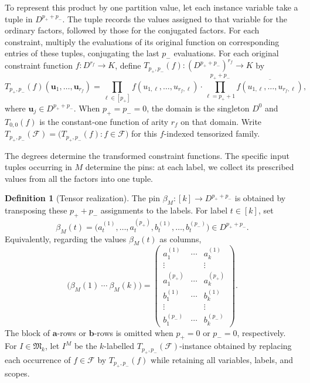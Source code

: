\documentclass[11pt,letterpaper,onecolumn]{article}
\theoremstyle{plain}
\theoremstyle{definition}
\newtheorem{definition}[definition]{Definition}
\theoremstyle{remark}
\newcommand{\cF}{\mathcal F}
\newcommand{\InstMonoid}[1]{\mathfrak M_{#1}}
\begin{document}
To represent this product by one partition value, let each instance
variable take a tuple in $D^{p_++p_-}$.  The tuple records the values
assigned to that variable for the ordinary factors, followed by those
for the conjugated factors.  For each constraint, multiply
the evaluations of its original function on corresponding entries of
these tuples, conjugating the last $p_-$ evaluations.
For each original constraint function $f:D^{r_f}\to K$, define
$T_{p_+,p_-}(f):(D^{p_++p_-})^{r_f}\to K$ by
\begin{equation*}
  T_{p_+,p_-}(f)(\mathbf u_1,\ldots,\mathbf u_{r_f})
  =\prod_{\ell\in[p_+]}f(u_{1,\ell},\ldots,u_{r_f,\ell})
   \cdot\prod_{\ell=p_++1}^{p_++p_-}
      \overline{f(u_{1,\ell},\ldots,u_{r_f,\ell})},
\end{equation*}
where $\mathbf u_j\in D^{p_++p_-}$.  When $p_+=p_-=0$, the domain is the
singleton $D^0$ and $T_{0,0}(f)$ is the constant-one function of arity
$r_f$ on that domain.  Write $T_{p_+,p_-}(\cF)=\bigl(T_{p_+,p_-}(f):f\in\cF\bigr)$ for this $f$-indexed tensorized family.

The degrees determine the transformed constraint functions.  The
specific input tuples occurring in $M$ determine the pins: at each label,
we collect its prescribed values from all the factors into one tuple.

\begin{definition}[Tensor realization]
\label{def:tensor-realization}
The pin $\beta_M:[k]\to D^{p_++p_-}$ is obtained by transposing these $p_++p_-$
assignments to the labels.  For label $t\in[k]$, set
\[
  \beta_M(t)
  =\bigl(a_t^{(1)},\ldots,a_t^{(p_+)},
          b_t^{(1)},\ldots,b_t^{(p_-)}\bigr)\in D^{p_++p_-}.
\]
Equivalently, regarding the values $\beta_M(t)$ as columns,
\begin{equation*}
  \bigl(\beta_M(1)\ \cdots\ \beta_M(k)\bigr)
  =
  \begin{pmatrix}
    a_1^{(1)}&\cdots&a_k^{(1)}\\
    \vdots&&\vdots\\
    a_1^{(p_+)}&\cdots&a_k^{(p_+)}\\
    b_1^{(1)}&\cdots&b_k^{(1)}\\
    \vdots&&\vdots\\
    b_1^{(p_-)}&\cdots&b_k^{(p_-)}
  \end{pmatrix}.
\end{equation*}
The block of $\mathbf a$-rows or $\mathbf b$-rows is omitted when $p_+=0$ or
$p_-=0$, respectively.
For $I\in\InstMonoid{k}$, let $I^M$ be the $k$-labelled
$T_{p_+,p_-}(\cF)$-instance obtained by replacing each occurrence of
$f\in\cF$ by $T_{p_+,p_-}(f)$ while retaining all variables, labels, and scopes.
\end{definition}
\end{document}
